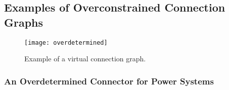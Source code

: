 \subsection{Examples of Overconstrained Connection Graphs}\label{examples-of-overconstrained-connection-graphs}

\begin{example}
\begin{figure}[H]
\caption{Example of a virtual connection graph.}
\texttt{[image: overdetermined]}
\end{figure}
\end{example}

\subsubsection{An Overdetermined Connector for Power Systems}\label{an-overdetermined-connector-for-power-systems}

